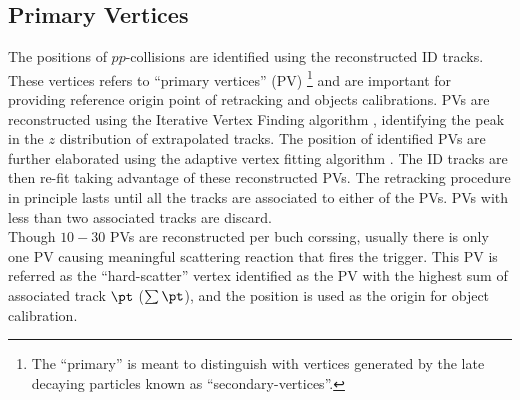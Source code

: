 \subsection{Primary Vertices} \label{sec::objDef::PV}
The positions of $pp$-collisions are identified using the reconstructed ID tracks. These vertices refers to ``primary vertices'' (PV) 
\footnote{The ``primary'' is meant to distinguish with vertices generated by the late decaying particles known as ``secondary-vertices''.}
and are important for providing reference origin point of retracking and objects calibrations.
PVs are reconstructed using the Iterative Vertex Finding algorithm \cite{134_vertexing_Run1}\cite{135_vertexing_Run1_2012}, identifying the peak in the $z$ distribution of extrapolated tracks. The position of identified PVs are further elaborated using the adaptive vertex fitting algorithm \cite{136_adaVertexFit}.
The ID tracks are then re-fit taking advantage of these reconstructed PVs. The retracking procedure in principle lasts until all the tracks are associated to either of the PVs. PVs with less than two associated tracks are discard.  \\

Though $10-30$ PVs are reconstructed per buch corssing, usually there is only one PV causing meaningful scattering reaction that fires the trigger. This PV is referred as the ``hard-scatter'' vertex  identified as the PV with the highest sum of associated track $\pt$ ($\sum\pt$), and the position is used as the origin for object calibration. \\






